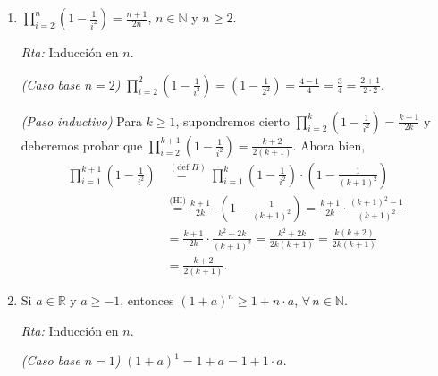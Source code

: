 \documentclass[a4paper,12pt,twoside,spanish,reqno]{amsbook}
\numberwithin{equation}{section}
\newcommand{\rta}{\noindent\textit{Rta: }}
\begin{document}
\begin{enumerate}[resume]
\begin{enumerate}
                
                \item $\displaystyle{ \prod_{i=2}^n \left(1-\frac{1}{i^2}\right) = \frac{n+1}{2n}}$, $n\in \mathbb N$ y $ n\ge 2$.
                
                \rta Inducción en $n$.
                
                \textit{(Caso base $n=2$) } $\prod_{i=2}^2 \left(1-\frac{1}{i^2}\right) = (1- \frac{1}{2^2}) = \frac{4-1}{4} = \frac{3}{4} = \frac{2+1}{2 \cdot 2}$.
                
                \textit{(Paso inductivo) } Para  $k \ge 1$,  supondremos cierto $\prod_{i=2}^k \left(1-\frac{1}{i^2}\right) = \frac{k+1}{2k}$ y  deberemos probar  que $\prod_{i=2}^{k+1} \left(1-\frac{1}{i^2}\right) = \frac{k+2}{2(k+1)}$. Ahora bien,
                \begin{align*}
                \prod_{i=1}^{k+1}\left(1-\frac{1}{i^2}\right) &\overset{(\text{def } \Pi)}{=\quad} \prod_{i=1}^k \left(1-\frac{1}{i^2}\right) \cdot \left(1-\frac{1}{(k+1)^2}\right)\\ &\overset{\text{(HI)}}{=}  \frac{k+1}{2k} \cdot\left(1-\frac{1}{(k+1)^2}\right)
                =  \frac{k+1}{2k} \cdot\frac{(k+1)^2- 1}{(k+1)^2} \\
                &= \frac{k+1}{2k} \cdot\frac{k^2+2k}{(k+1)^2} = \frac{k^2+2k}{2k (k+1)} = \frac{k(k+2)}{2k (k+1)} \\
                &=  \frac{k+2}{2 (k+1)}.
                \end{align*}
                
                \item Si $a\in \mathbb R$ y $a\geq -1$, entonces $(1+a)^n\geq 1+n\cdot a$, $\forall \, n \in \mathbb N$.
                
                \rta Inducción en $n$.
                
                \textit{(Caso base $n=1$) } $(1+a)^1 = 1+a = 1+ 1\cdot a$. 
                

\end{enumerate}
\end{enumerate}
\end{document}
